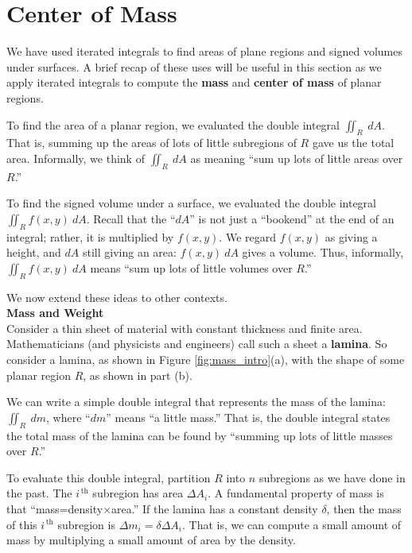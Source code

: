 \section{Center of Mass}\label{sec:center_of_mass}

We have used iterated integrals to find areas of plane regions and signed volumes under surfaces. A brief recap of these uses will be useful in this section as we apply iterated integrals to compute the \textbf{mass} and \textbf{center of mass} of planar regions.

To find the area of a planar region, we evaluated the double integral $\iint_R\ dA$. That is, summing up the areas of lots of little subregions of $R$ gave us the total area. Informally, we think of $\iint_R\ dA$ as meaning ``sum up lots of little areas over $R$.''

To find the signed volume under a surface, we evaluated the double integral $\iint_R f(x,y)\ dA$. Recall that the ``$dA$'' is not just a ``bookend'' at the end of an integral; rather, it is multiplied by $f(x,y)$. We regard $f(x,y)$ as giving a height, and $dA$ still giving an area: $f(x,y)\ dA$ gives a volume. Thus, informally, $\iint_Rf(x,y)\ dA$ means ``sum up lots of little volumes over $R$.''

We now extend these ideas to other contexts.\\

\noindent\textbf{\large Mass and Weight}\\

Consider a thin sheet of material with constant thickness and finite area. Mathematicians (and physicists and engineers) call such a sheet a \textbf{lamina}. So consider a lamina, as shown in Figure \ref{fig:mass_intro}(a),  with the shape of some planar region $R$, as shown in part (b).

We can write a simple double integral that represents the mass of the lamina: $\iint_R\ dm$, where ``$dm$'' means ``a little mass.'' That is, the double integral states the total mass of the lamina can be found by ``summing up lots of little masses over $R$.''

To evaluate this double integral, partition $R$ into $n$ subregions as we have done in the past. The $i^{\,\text{th}}$ subregion has area $\Delta A_i$. 
A fundamental property of mass is that ``mass=density$\times$area.'' If the lamina has a constant density $\delta$, then the mass of this $i^{\,\text{th}}$ subregion is $\Delta m_i=\delta\Delta A_i$. %
That is, we can compute a small amount of mass by multiplying a small amount of area by the density.

